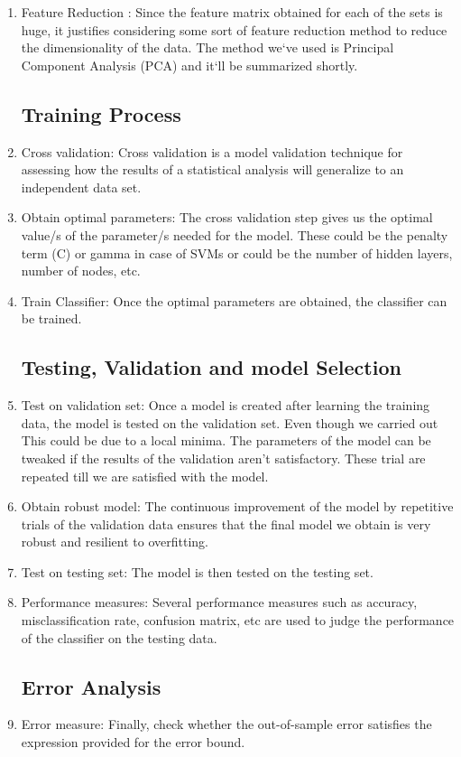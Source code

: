 \documentclass[letterpaper,12pt, onecolumn]{article}%
\begin{document}
\begin{enumerate}
  \item Feature Reduction : Since the feature matrix obtained for each of the sets is huge, it justifies considering some sort of feature reduction method to reduce the dimensionality of the data. The method we`ve used is Principal Component Analysis (PCA) and it`ll be summarized shortly.
  
\subsection*{Training Process}
\item Cross validation: Cross validation is a model validation technique for assessing how the results of a statistical analysis will generalize to an independent data set.

\item Obtain optimal parameters: The cross validation step gives us the optimal value/s of the parameter/s needed for the model. These could be the penalty term (C) or gamma in case of SVMs or could be the number of hidden layers, number of nodes, etc. 

\item Train Classifier: Once the optimal parameters are obtained, the classifier can be trained.

\subsection*{Testing, Validation and model Selection}
\item Test on validation set: Once a model is created after learning the training data, the model is tested on the validation set. Even though we carried out This could be due to a local minima. The parameters of the model can be tweaked if the results of the validation aren’t satisfactory. These trial are repeated till we are satisfied with the model.

\item Obtain robust model: The continuous improvement of the model by repetitive trials of the validation data ensures that the final model we obtain is very robust and resilient to overfitting.

\item Test on testing set: The model is then tested on the testing set.

\item Performance measures: Several performance measures such as accuracy, misclassification rate, confusion matrix, etc are used to judge the performance of the classifier on the testing data. 

\subsection*{Error Analysis}
\item Error measure: Finally, check whether the out-of-sample error satisfies the expression provided for the error bound.
 
\end{enumerate}
\end{document}
